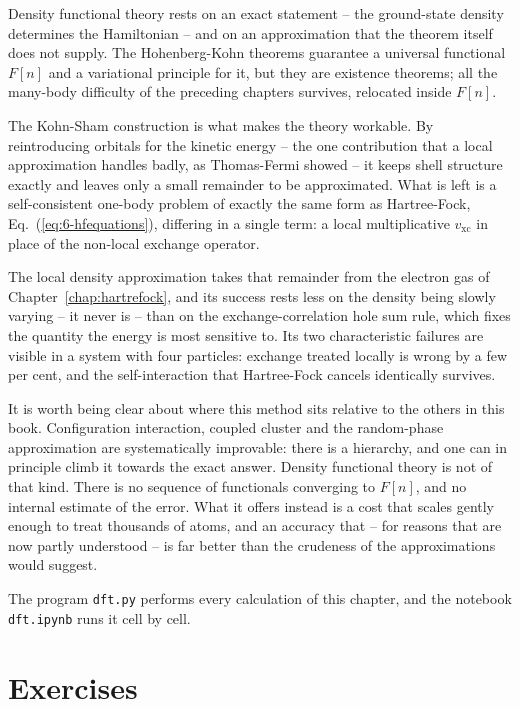 Density functional theory rests on an exact statement -- the ground-state
density determines the Hamiltonian -- and on an approximation that the theorem
itself does not supply.  The Hohenberg-Kohn theorems guarantee a universal
functional $F[n]$ and a variational principle for it, but they are existence
theorems; all the many-body difficulty of the preceding chapters survives,
relocated inside $F[n]$.

The Kohn-Sham construction is what makes the theory workable.  By
reintroducing orbitals for the kinetic energy -- the one contribution that a
local approximation handles badly, as Thomas-Fermi showed -- it keeps shell
structure exactly and leaves only a small remainder to be approximated.  What
is left is a self-consistent one-body problem of exactly the same form as
Hartree-Fock, Eq.~(\ref{eq:6-hfequations}), differing in a single term: a
local multiplicative $v_{\mathrm{xc}}$ in place of the non-local exchange
operator.

The local density approximation takes that remainder from the electron gas of
Chapter~\ref{chap:hartrefock}, and its success rests less on the density
being slowly varying -- it never is -- than on the exchange-correlation hole
sum rule, which fixes the quantity the energy is most sensitive to.  Its two
characteristic failures are visible in a system with four particles: exchange
treated locally is wrong by a few per cent, and the self-interaction that
Hartree-Fock cancels identically survives.

It is worth being clear about where this method sits relative to the others in
this book.  Configuration interaction, coupled cluster and the random-phase
approximation are systematically improvable: there is a hierarchy, and one
can in principle climb it towards the exact answer.  Density functional
theory is not of that kind.  There is no sequence of functionals converging to
$F[n]$, and no internal estimate of the error.  What it offers instead is a
cost that scales gently enough to treat thousands of atoms, and an accuracy
that -- for reasons that are now partly understood -- is far better than the
crudeness of the approximations would suggest.

The program \texttt{dft.py} performs every calculation of this chapter, and
the notebook \texttt{dft.ipynb} runs it cell by cell.

\section{Exercises}
\label{sec:ch8exercises}

